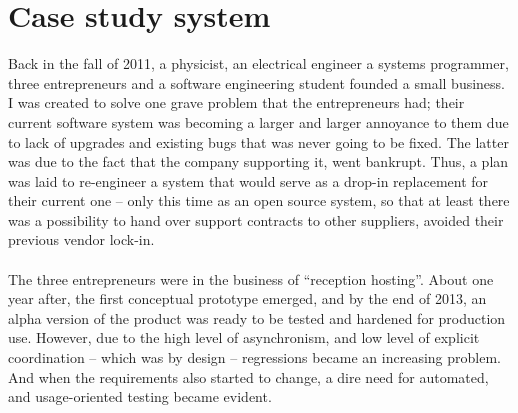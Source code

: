 \section{Case study system}
Back in the fall of 2011, a physicist, an electrical engineer a systems programmer, three entrepreneurs and a software engineering student founded a small business. I was created to solve one grave problem that the entrepreneurs had; their current software system was becoming a larger and larger annoyance to them due to lack of upgrades and existing bugs that was never going to be fixed. The latter was due to the fact that the company supporting it, went bankrupt. Thus, a plan was laid to re-engineer a system that would serve as a drop-in replacement for their current one -- only this time as an open source system, so that at least there was a possibility to hand over support contracts to other suppliers, avoided their previous vendor lock-in.\\\\
The three entrepreneurs were in the business of ``reception hosting''. About one year after, the first conceptual prototype emerged, and by the end of 2013, an alpha version of the product was ready to be tested and hardened for production use. However, due to the high level of asynchronism, and low level of explicit coordination -- which was by design -- regressions became an increasing problem. And when the requirements also started to change, a dire need for automated, and usage-oriented testing became evident.


